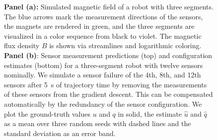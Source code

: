\begin{figure}[hbt]
\centering
\caption{\textbf{Panel (a):} Simulated magnetic field of a robot with three segments. The blue arrows mark the measurement directions of the sensors, the magnets are rendered in green, and the three segments are visualized in a color sequence from black to violet. The magnetic flux density $B$ is shown via streamlines and logarithmic coloring. \textbf{Panel (b)}: Sensor measurement predictions (top) and configuration estimates (bottom) for a three-segment robot with twelve sensors nominally. We simulate a sensor failure of the 4th, 8th, and 12th sensors after \SI{5}{s} of trajectory time by removing the measurements of these sensors from the gradient descent. This can be compensated automatically by the redundancy of the sensor configuration. We plot the ground-truth values $u$ and $q$ in solid, the estimate $\hat{u}$ and $\hat{q}$ as a mean over three random seeds with dashed lines and the standard deviation as an error band.}
\end{figure}

